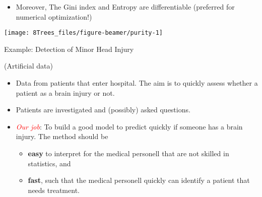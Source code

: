 \documentclass[
  10pt,
  ignorenonframetext,
]{beamer}
\providecommand{\tightlist}{%
  \setlength{\itemsep}{0pt}\setlength{\parskip}{0pt}}
\begin{document}
\begin{frame}
\begin{itemize}
\tightlist
\item
  Moreover, The Gini index and Entropy are differentiable (preferred for
  numerical optimization!)
\end{itemize}

\begin{center}\texttt{[image: 8Trees\_files/figure-beamer/purity-1]} \end{center}
\end{frame}

\begin{frame}
\begin{block}{Example: Detection of Minor Head Injury}
\protect\hypertarget{example-detection-of-minor-head-injury}{}
\tiny

(Artificial data) \vspace{2mm}

\normalsize

\begin{itemize}
\tightlist
\item
  Data from patients that enter hospital. The aim is to quickly assess
  whether a patient as a brain injury or not.
\end{itemize}

\vspace{2mm}

\begin{itemize}
\tightlist
\item
  Patients are investigated and (possibly) asked questions.
\end{itemize}

\vspace{2mm}

\begin{itemize}
\item
  \emph{\textcolor{red}{Our job}}: To build a good model to predict
  quickly if someone has a brain injury. The method should be
  \vspace{1mm}

  \begin{itemize}
  \item
    \textbf{easy} to interpret for the medical personell that are not
    skilled in statistics, and \vspace{1mm}
  \item
    \textbf{fast}, such that the medical personell quickly can identify
    a patient that needs treatment.
  \end{itemize}
\end{itemize}
\end{block}
\end{frame}
\end{document}
